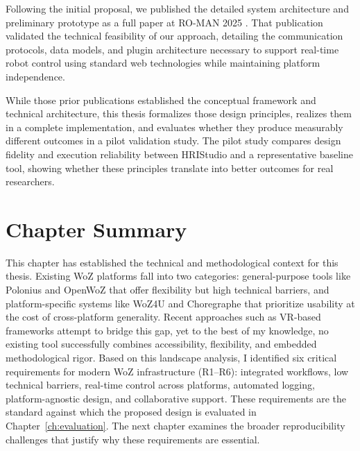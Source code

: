 Following the initial proposal, we published the detailed system architecture and preliminary prototype as a full paper at RO-MAN 2025 \cite{OConnor2025}. That publication validated the technical feasibility of our approach, detailing the communication protocols, data models, and plugin architecture necessary to support real-time robot control using standard web technologies while maintaining platform independence.

While those prior publications established the conceptual framework and technical architecture, this thesis formalizes those design principles, realizes them in a complete implementation, and evaluates whether they produce measurably different outcomes in a pilot validation study. The pilot study compares design fidelity and execution reliability between HRIStudio and a representative baseline tool, showing whether these principles translate into better outcomes for real researchers.

\section{Chapter Summary}

This chapter has established the technical and methodological context for this thesis. Existing WoZ platforms fall into two categories: general-purpose tools like Polonius and OpenWoZ that offer flexibility but high technical barriers, and platform-specific systems like WoZ4U and Choregraphe that prioritize usability at the cost of cross-platform generality. Recent approaches such as VR-based frameworks attempt to bridge this gap, yet to the best of my knowledge, no existing tool successfully combines accessibility, flexibility, and embedded methodological rigor. Based on this landscape analysis, I identified six critical requirements for modern WoZ infrastructure (R1--R6): integrated workflows, low technical barriers, real-time control across platforms, automated logging, platform-agnostic design, and collaborative support. These requirements are the standard against which the proposed design is evaluated in Chapter~\ref{ch:evaluation}. The next chapter examines the broader reproducibility challenges that justify why these requirements are essential.
